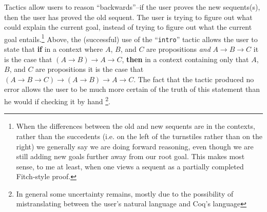\documentclass[11pt]{amsart}
\newcommand{\ra}{\ensuremath{\rightarrow}}
\begin{document}
Tactics allow users to reason ``backwards''--if the user proves the new sequents(s), then the user has proved the old sequent.  The user is trying to figure out what could explain the current goal, instead of trying to figure out what the current goal entails.\footnote{When the differences between the old and new sequents are in the contexts, rather than the succedents (i.e. on the left of the turnstiles rather than on the right) we generally say we are doing forward reasoning, even though we are still adding new goals further away from our root goal.  This makes most sense, to me at least, when one views a sequent as a partially completed Fitch-style proof. }  Above, the (successful) use of the ``\texttt{intro}'' tactic allows the user to state that {\bf if} in a context where $A$, $B$, and $C$ are propositions \textit{and} $A \ra B \ra C$ it is the case that $(A \ra B) \ra A \ra C$, {\bf then} in a context containing only that $A$, $B$, and $C$ are propositions it is the case that $(A \ra B \ra C) \ra (A \ra B) \ra A \ra C$.  The fact that the tactic produced no error allows the user to be much more certain of the truth of this statement than he would if checking it by hand \footnote{In general some uncertainty remains, mostly due to the possibility of mistranslating between the user's natural language and Coq's language}.
\end{document}
